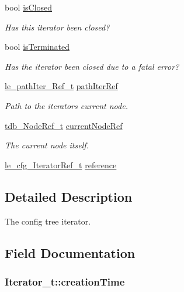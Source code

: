 \begin{DoxyCompactItemize}
bool \hyperlink{struct_iterator__t_afb3098af280e2634bdd21cb34fc1d0a9}{is\+Closed}
\begin{DoxyCompactList}\small\item\em Has this iterator been closed? \end{DoxyCompactList}\item 
bool \hyperlink{struct_iterator__t_a4225f496cbbe8d552aa0af909da10576}{is\+Terminated}
\begin{DoxyCompactList}\small\item\em Has the iterator been closed due to a fatal error? \end{DoxyCompactList}\item 
\hyperlink{le__path_iter_8h_a0facb15e56e7ef896384eca415a7147a}{le\+\_\+path\+Iter\+\_\+\+Ref\+\_\+t} \hyperlink{struct_iterator__t_a5fefff652d200b321128de47f924cdea}{path\+Iter\+Ref}
\begin{DoxyCompactList}\small\item\em Path to the iterator\textquotesingle{}s current node. \end{DoxyCompactList}\item 
\hyperlink{tree_db_8h_a4c1f526addd1a1042694efa439a97801}{tdb\+\_\+\+Node\+Ref\+\_\+t} \hyperlink{struct_iterator__t_a831c03cf118d0ac30d67e664ab49f5a5}{current\+Node\+Ref}
\begin{DoxyCompactList}\small\item\em The current node itself. \end{DoxyCompactList}\item 
\hyperlink{le__cfg__interface_8h_a646829934bb23a878e19ade2c3e01eba}{le\+\_\+cfg\+\_\+\+Iterator\+Ref\+\_\+t} \hyperlink{struct_iterator__t_aa3ddd0c1f4109a9a57d5723555554782}{reference}
\end{DoxyCompactItemize}


\subsection{Detailed Description}
The config tree iterator. 

\subsection{Field Documentation}
\subsubsection[{\texorpdfstring{creation\+Time}{creationTime}}]{ Iterator\+\_\+t\+::creation\+Time}\hypertarget{struct_iterator__t_af6263176bfff7465debdc9c15172144e}{}\label{struct_iterator__t_af6263176bfff7465debdc9c15172144e}


